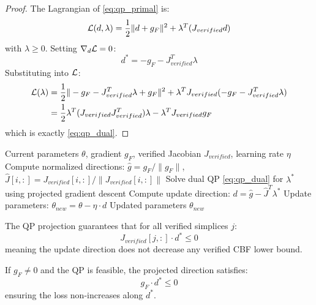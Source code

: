 \begin{proof}
    The Lagrangian of \eqref{eq:qp_primal} is:
    \begin{equation}
        \mathcal{L}(d, \lambda) = \frac{1}{2} \|d + g_F\|^2 + \lambda^T (J_{verified} d)
    \end{equation}
    with $\lambda \geq 0$. Setting $\nabla_d \mathcal{L} = 0$:
    \begin{equation}
        d^* = -g_F - J_{verified}^T \lambda
    \end{equation}
    Substituting into $\mathcal{L}$:
    \begin{align}
        \mathcal{L}(\lambda) &= \frac{1}{2} \| -g_F - J_{verified}^T \lambda + g_F \|^2 + \lambda^T J_{verified}(-g_F - J_{verified}^T \lambda) \\
        &= \frac{1}{2} \lambda^T (J_{verified} J_{verified}^T) \lambda - \lambda^T J_{verified} g_F
    \end{align}
    which is exactly \eqref{eq:qp_dual}.
\end{proof}

\begin{algorithm}[t]
    \caption{QP Projection for Constrained Parameter Update}
    \label{alg:qp_projection}
    \begin{algorithmic}
        \REQUIRE Current parameters $\theta$, gradient $g_F$, verified Jacobian $J_{verified}$, learning rate $\eta$
        \STATE Compute normalized directions: $\hat{g} = g_F / \|g_F\|$, $\hat{J}[i,:] = J_{verified}[i,:] / \|J_{verified}[i,:]\|$
        \STATE Solve dual QP \eqref{eq:qp_dual} for $\lambda^*$ using projected gradient descent
        \STATE Compute update direction: $d = \hat{g} - \hat{J}^T \lambda^*$
        \STATE Update parameters: $\theta_{new} = \theta - \eta \cdot d$
        \RETURN Updated parameters $\theta_{new}$
    \end{algorithmic}
\end{algorithm}

\begin{property}
    The QP projection guarantees that for all verified simplices $j$:
    \begin{equation}
        J_{verified}[j,:] \cdot d^* \leq 0
        \label{eq:constraint_satisfied}
    \end{equation}
    meaning the update direction does not decrease any verified CBF lower bound.
\end{property}

\begin{property}
    If $g_F \neq 0$ and the QP is feasible, the projected direction satisfies:
    \begin{equation}
        g_F \cdot d^* \leq 0
        \label{eq:descent}
    \end{equation}
    ensuring the loss non-increases along $d^*$.
\end{property}

